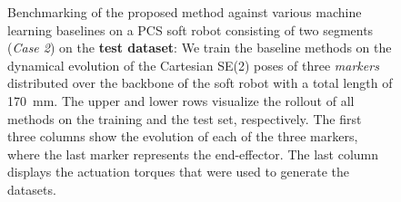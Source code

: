 \begin{figure}[ht]

    \caption{Benchmarking of the proposed method against various machine learning baselines on a PCS soft robot consisting of two segments (\emph{Case 2}) on the \textbf{test dataset}: We train the baseline methods on the dynamical evolution of the Cartesian SE(2) poses of three \emph{markers} distributed over the backbone of the soft robot with a total length of \SI{170}{mm}. The upper and lower rows visualize the rollout of all methods on the training and the test set, respectively. The first three columns show the evolution of each of the three markers, where the last marker represents the end-effector. The last column displays the actuation torques that were used to generate the datasets.}
    \label{fig:pcsregression:dynamics_pcs_ns-2_with_baselines:test}
\end{figure}




